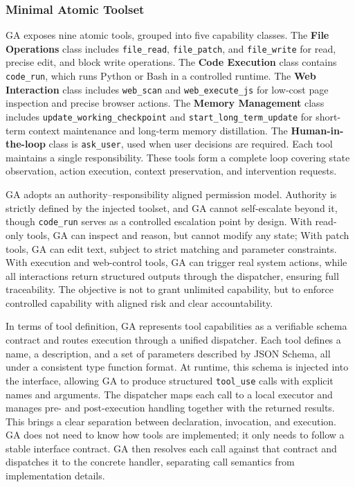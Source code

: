 \subsubsection{Minimal Atomic Toolset}
\label{sec:tools}

GA exposes nine atomic tools, grouped into five capability classes.  
The \textbf{File Operations} class includes \texttt{file\_read}, \texttt{file\_patch}, and \texttt{file\_write} for read, precise edit, and block write operations.  
The \textbf{Code Execution} class contains \texttt{code\_run}, which runs Python or Bash in a controlled runtime.  
The \textbf{Web Interaction} class includes \texttt{web\_scan} and \texttt{web\_execute\_js} for low-cost page inspection and precise browser actions.  
The \textbf{Memory Management} class includes \texttt{update\_working\_checkpoint} and \texttt{start\_long\_term\_update} for short-term context maintenance and long-term memory distillation.  
The \textbf{Human-in-the-loop} class is \texttt{ask\_user}, used when user decisions are required. 
Each tool maintains a single responsibility.
These tools form a complete loop covering state observation, action execution, context preservation, and intervention requests.

GA adopts an authority–responsibility aligned permission model.
Authority is strictly defined by the injected toolset, and GA cannot self-escalate beyond it, though \texttt{code\_run} serves as a controlled escalation point by design.
With read-only tools, GA can inspect and reason, but cannot modify any state;
With patch tools, GA can edit text, subject to strict matching and parameter constraints.
With execution and web-control tools, GA can trigger real system actions, while all interactions return structured outputs through the dispatcher, ensuring full traceability.
The objective is not to grant unlimited capability, but to enforce controlled capability with aligned risk and clear accountability.

In terms of tool definition, GA represents tool capabilities as a verifiable schema contract and routes execution through a unified dispatcher.
Each tool defines a name, a description, and a set of parameters described by JSON Schema, all under a consistent type function format.
At runtime, this schema is injected into the interface, allowing GA to produce structured \texttt{tool\_use} calls with explicit names and arguments.
The dispatcher maps each call to a local executor and manages pre- and post-execution handling together with the returned results.
This brings a clear separation between declaration, invocation, and execution. 
GA does not need to know how tools are implemented; it only needs to follow a stable interface contract.
GA then resolves each call against that contract and dispatches it to the concrete handler, separating call semantics from implementation details.

